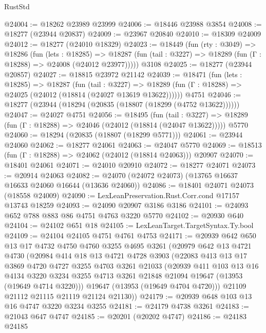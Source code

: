 \begin{lexlean}{RustStd}
\begin{coremodule}
@24004 := @18262 @23989 @23999
@24006 := @18446 @23988 @3854
@24008 := @18277 (@23944 @20837)
@24009 := @23967 @20840
@24010 := @18309 @24009
@24012 := @18277 (@24010 @18329)
@24023 := @18449
    (fun (rty : @3049) =>
    @18286
      (fun (lets : @18285) =>
      @18287 (fun (tail : @3227) => @18289 (fun (Γ : @18288) => @24008 (@24012 @23977)))))
    @3108
@24025 := @18277 (@23944 @20857)
@24027 := @18815 @23972 @21142
@24039 := @18471
    (fun (lets : @18285) =>
    @18287
      (fun (tail : @3227) =>
      @18289 (fun (Γ : @18288) => @24025 (@24012 (@18814 (@24027 @13619 @13622))))))
    @4751
@24046 := @18277 (@23944 (@18294 (@20835 (@18807 (@18299 (@4752 @13622))))))
@24047 := @24027 @4751
@24056 := @18495
    (fun (tail : @3227) => @18289 (fun (Γ : @18288) => @24046 (@24012 (@18814 (@24047 @13622)))))
    @5770
@24060 := @18294 (@20835 (@18807 (@18299 @5771)))
@24061 := @23944 @24060
@24062 := @18277 @24061
@24063 := @24047 @5770
@24069 := @18513 (fun (Γ : @18288) => @24062 (@24012 (@18814 @24063))) @20907
@24070 := @18401 @24061
@24071 := @24010 @20910
@24072 := @18277 @24071
@24073 := @20914 @24063
@24082 := @24070 (@24072 @24073) (@13765 @16637 @16633 @24060 @16644 (@13636 @24060))
@24086 := @18401 @24071 @24073 (@18558 @24009)
@24090 := LexLeanPreservation.Rust.Corr.cond @17157 @13743 @18259
@24093 := @24090 @20907 @3186 @3186
@24101 := @24093 @652 @788 @883 @86 @4751 @4763 @3220 @5770
@24102 := @20930 @640
@24104 := @24102 @651 @18
@24105 := LexLeanTarget.TargetSyntax.Ty.bool
@24109 := @24104 @24105 @4751 @4761 @4753
@24171 := @20939
    @642
    @650
    @13
    @17
    @4732
    @4750
    @4760
    @3255
    @4695
    @3261
    (@20979
      @642
      @13
      @4721
      @4730
      (@20984
        @414
        @18
        @13
        @4721
        @4728
        @3903
        (@22083
          @413
          @13
          @17
          @3869
          @4720
          @4727
          @3255
          @4703
          @3261
          @21033
          (@20939
            @411
            @103
            @13
            @16
            @4134
            @3220
            @3234
            @3255
            @4713
            @3261
            @21848
            @21094
            @19647
            (@13953 (@19649 @4714 @3220)))
          @19647
          (@13953 (@19649 @4704 @4720)))
        @21109
        @21112
        @21115
        @21119
        @21124
        @21130))
@24179 := @20939 @648 @103 @13 @16 @4747 @3220 @3234 @3255
@24181 := @24179 @4738 @3261
@24183 := @21043 @647 @4747
@24185 := @20201 (@20202 @4747)
@24186 := @24183 @24185

\end{coremodule}
\end{lexlean}
